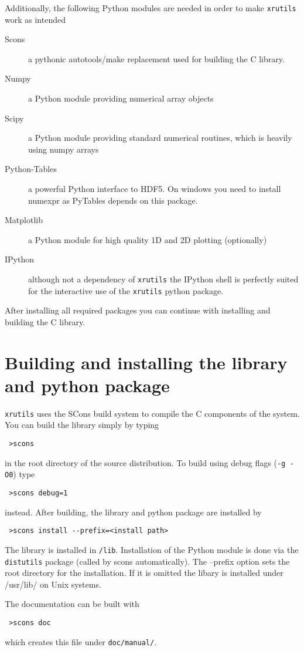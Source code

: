 Additionally, the following Python modules are needed in order to make 
{\tt xrutils} work as intended
\begin{description}
\item[Scons] a pythonic autotools/make replacement used for building the C library.
\item[Numpy] a Python module providing numerical array objects
\item[Scipy] a Python module providing standard numerical routines, which is heavily using numpy arrays
\item[Python-Tables] a powerful Python interface to HDF5. On windows you need to install numexpr as PyTables depends on this package.
\item[Matplotlib] a Python module for high quality 1D and 2D plotting (optionally)
\item[IPython] although not a dependency of {\tt xrutils} the IPython shell is perfectly suited for the interactive use of the {\tt xrutils} python package.
\end{description}
After installing all required packages you can continue with installing and
building the C library.

\section{Building and installing the library and python package}

{\tt xrutils} uses the SCons build system to compile the C components of the
system. You can build the library simply by typing 
\begin{verbatim}
 >scons
\end{verbatim}
in the root directory of the source distribution. To build using debug flags ({\tt -g -O0}) type
\begin{verbatim}
 >scons debug=1
\end{verbatim}
instead. After building, the library and python package are installed by
\begin{verbatim}
 >scons install --prefix=<install path>
\end{verbatim}
The library is installed in {\tt<install path>/lib}. Installation of the Python module 
is done via the {\tt distutils} package (called by scons automatically).
The --prefix option sets the root directory for the installation. If it is omitted
the libary is installed under /usr/lib/ on Unix systems.

The documentation can be built with 
\begin{verbatim}
 >scons doc
\end{verbatim}
which creates this file under {\tt doc/manual/}.

